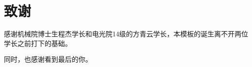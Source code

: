 \chapter*{致\quad 谢}

\songti\xiaosi
\begin{spacing}{1.5}

感谢机械院博士生程杰学长和电光院14级的方青云学长，本模板的诞生离不开两位学长之前打下的基础。

同时，也感谢看到最后的你。



\end{spacing}